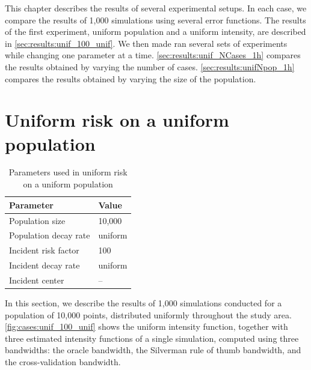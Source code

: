 

This chapter describes the results of several experimental setups.
In each case, we compare the results of 1,000 simulations using several error functions.
The results of the first experiment, uniform population and a uniform intensity, are described in \autoref{sec:results:unif_100_unif}.
We then made ran several sets of experiments while changing one parameter at a time.
\autoref{sec:results:unif_NCases_1h} compares the results obtained by varying the number of cases.
\autoref{sec:results:unifNpop_1h} compares the results obtained by varying the size of the population.


\section{Uniform risk on a uniform population}
\label{sec:results:unif_100_unif}

\begin{table}[htbp]
\centering
\begin{tabular}{ll}
\hline
Parameter & Value \\
\hline
Population size & 10,000 \\
Population decay rate & uniform \\
Incident risk factor & 100 \\
Incident decay rate & uniform \\
Incident center & -- \\
\hline
\end{tabular}
\caption{Parameters used in uniform risk on a uniform population}
\label{tbl:params:unif_100_unif}
\end{table}

In this section, we describe the results of 1,000 simulations conducted for a population of 10,000 points, distributed uniformly throughout the study area.
\autoref{fig:cases:unif_100_unif} shows the uniform intensity function, together with three estimated intensity functions of a single simulation,
computed using three bandwidths: the oracle bandwidth, the Silverman rule of thumb bandwidth, and the cross-validation bandwidth.

